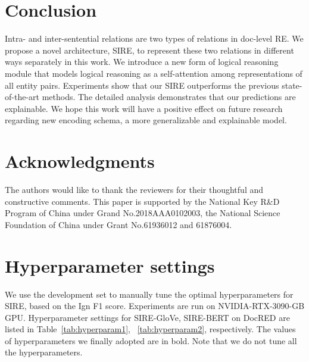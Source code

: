 \documentclass[11pt,a4paper]{article}
\begin{document}
 \section{Conclusion}
Intra- and inter-sentential relations are two types of relations in doc-level RE. We propose a novel architecture, SIRE, to represent these two relations in different ways separately in this work. We introduce a new form of logical reasoning module that models logical reasoning as a self-attention among representations of all entity pairs. Experiments show that our SIRE outperforms the previous state-of-the-art methods. The detailed analysis demonstrates that our predictions are explainable. We hope this work will have a positive effect on future research regarding new encoding schema, a more generalizable and explainable model. 


\section*{Acknowledgments}
The authors would like to thank the reviewers for their thoughtful and constructive comments.
This paper is supported by the National Key R\&D Program of China under Grand No.2018AAA0102003, the National Science Foundation of China under Grant No.61936012 and 61876004.




\appendix

\section{Hyperparameter settings\label{sec:appendix}}


We use the development set to manually tune the optimal hyperparameters for SIRE, based on the Ign F1 score.
Experiments are run on NVIDIA-RTX-3090-GB GPU.
Hyperparameter settings for SIRE-GloVe, SIRE-BERT on DocRED are listed in Table~\ref{tab:hyperparam1}, ~\ref{tab:hyperparam2}, respectively. The values of hyperparameters we finally adopted are in bold. Note that we do not tune all the hyperparameters.
\end{document}
